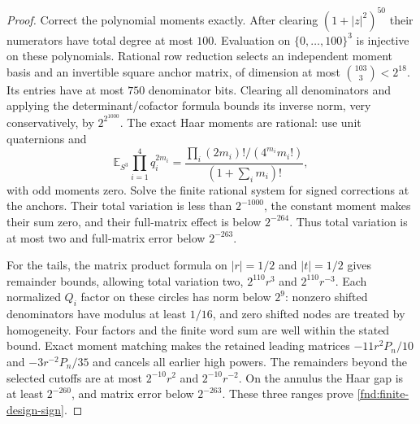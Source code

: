\documentclass[11pt,a4paper]{amsart}
\theoremstyle{definition}
\theoremstyle{remark}
\numberwithin{equation}{section}
\begin{document}
\begin{proof}
Correct the polynomial moments exactly. After clearing
$(1+|z|^2)^{50}$ their numerators have total degree at most $100$. Evaluation
on $\{0,\ldots,100\}^3$ is injective on these polynomials. Rational row
reduction selects an independent moment basis and an invertible square anchor
matrix, of dimension at most $\binom{103}{3}<2^{18}$. Its entries have at most
$750$ denominator bits. Clearing all denominators and applying the
determinant/cofactor formula bounds its inverse norm, very conservatively, by
$2^{2^{1000}}$. The exact Haar moments are rational: use unit quaternions and
\[
 \mathbb E_{S^3}\prod_{i=1}^4q_i^{2m_i}
 =\frac{\prod_i (2m_i)!/(4^{m_i}m_i!)}{(1+\sum_i m_i)!},
\]
with odd moments zero. Solve the finite rational system for signed corrections
at the anchors. Their total variation is less than $2^{-1000}$, the constant
moment makes their sum zero, and their full-matrix effect is below $2^{-264}$.
Thus total variation is at most two and full-matrix error below $2^{-263}$.

For the tails, the matrix product formula on $|r|=1/2$ and $|t|=1/2$ gives
remainder bounds, allowing total variation two, $2^{110}r^3$ and
$2^{110}r^{-3}$. Each normalized $Q_i$ factor on these circles has norm below
$2^9$: nonzero shifted denominators have modulus at least $1/16$, and zero
shifted nodes are treated by homogeneity. Four factors and the finite word
sum are well within the stated bound. Exact moment matching makes the
retained leading matrices $-11r^2P_n/10$ and $-3r^{-2}P_n/35$ and cancels all
earlier high powers. The remainders beyond the selected cutoffs are at most
$2^{-10}r^2$ and $2^{-10}r^{-2}$. On the annulus the Haar gap is at least
$2^{-260}$, and matrix error below $2^{-263}$. These three ranges prove
\eqref{fnd:finite-design-sign}.
\end{proof}
\end{document}
